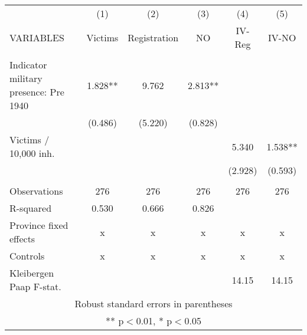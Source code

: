 \begin{tabular}{lccccc} \hline
 & (1) & (2) & (3) & (4) & (5) \\
VARIABLES & Victims & Registration & NO & IV-Reg & IV-NO \\ \hline
 &  &  &  &  &  \\
Indicator military presence: Pre 1940 & 1.828** & 9.762 & 2.813** &  &  \\
 & (0.486) & (5.220) & (0.828) &  &  \\
Victims / 10,000 inh. &  &  &  & 5.340 & 1.538** \\
 &  &  &  & (2.928) & (0.593) \\
 &  &  &  &  &  \\
Observations & 276 & 276 & 276 & 276 & 276 \\
R-squared & 0.530 & 0.666 & 0.826 &  &  \\
Province fixed effects & x & x & x & x & x \\
Controls & x & x & x & x & x \\
 Kleibergen Paap F-stat. &  &  &  & 14.15 & 14.15 \\ \hline
\multicolumn{6}{c}{ Robust standard errors in parentheses} \\
\multicolumn{6}{c}{ ** p$<$0.01, * p$<$0.05} \\
\end{tabular}
